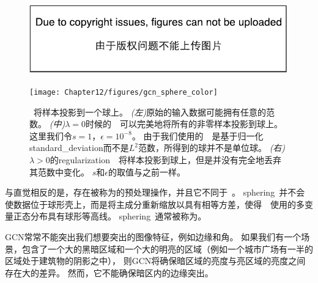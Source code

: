 \begin{figure}[!htb]
\ifOpenSource
\centerline{\includegraphics{figure.pdf}}
\else
	\centerline{\texttt{[image: Chapter12/figures/gcn\_sphere\_color]}}
\fi
	\caption{~将样本投影到一个球上。
\emph{(左)}原始的输入数据可能拥有任意的范数。
\emph{(中)}$\lambda=0$时候的~~可以完美地将所有的非零样本投影到球上。
这里我们令$s=1$，$\epsilon = 10^{-8}$。
由于我们使用的~~是基于归一化\gls{standard_deviation}而不是$L^2$范数，所得到的球并不是单位球。
\emph{(右)}$\lambda>0$的\gls{regularization}~~将样本投影到球上，但是并没有完全地丢弃其范数中变化。
$s$和$\epsilon$的取值与之前一样。}
\label{fig:gcn_sphere_color}
\end{figure}


与直觉相反的是，存在被称为的预处理操作，并且它不同于~。
\gls{sphering}~并不会使数据位于球形壳上，而是将主成分重新缩放以具有相等方差，使得~~使用的多变量正态分布具有球形等高线。 
\gls{sphering}~通常被称为。


\gls{GCN}常常不能突出我们想要突出的图像特征，例如边缘和角。
如果我们有一个场景，包含了一个大的黑暗区域和一个大的明亮的区域（例如一个城市广场有一半的区域处于建筑物的阴影之中），
则\gls{GCN}将确保暗区域的亮度与亮区域的亮度之间存在大的差异。
然而，它不能确保暗区内的边缘突出。

